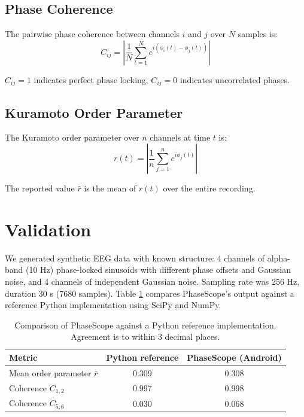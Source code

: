 \documentclass[11pt,a4paper]{article}
\begin{document}
\subsection{Phase Coherence}

The pairwise phase coherence between channels $i$ and $j$ over $N$ samples is:
\begin{equation}
C_{ij} = \left| \frac{1}{N} \sum_{t=1}^{N} e^{i(\phi_i(t) - \phi_j(t))} \right|
\end{equation}

$C_{ij} = 1$ indicates perfect phase locking, $C_{ij} = 0$ indicates uncorrelated phases.

\subsection{Kuramoto Order Parameter}

The Kuramoto order parameter \cite{kuramoto1975} over $n$ channels at time $t$ is:
\begin{equation}
r(t) = \left| \frac{1}{n} \sum_{j=1}^{n} e^{i \phi_j(t)} \right|
\end{equation}

The reported value $\bar{r}$ is the mean of $r(t)$ over the entire recording.

\section{Validation}

We generated synthetic EEG data with known structure: 4 channels of alpha-band (10 Hz) phase-locked sinusoids with different phase offsets and Gaussian noise, and 4 channels of independent Gaussian noise. Sampling rate was 256 Hz, duration 30 s (7680 samples). Table \ref{tab:validation} compares PhaseScope's output against a reference Python implementation using SciPy and NumPy.

\begin{table}[h]
\centering
\begin{tabular}{lcc}
\toprule
Metric & Python reference & PhaseScope (Android) \\
\midrule
Mean order parameter $\bar{r}$ & 0.309 & 0.308 \\
Coherence $C_{1,2}$ & 0.997 & 0.998 \\
Coherence $C_{5,6}$ & 0.030 & 0.068 \\
\bottomrule
\end{tabular}
\caption{Comparison of PhaseScope against a Python reference implementation. Agreement is to within 3 decimal places.}
\label{tab:validation}
\end{table}
\end{document}
